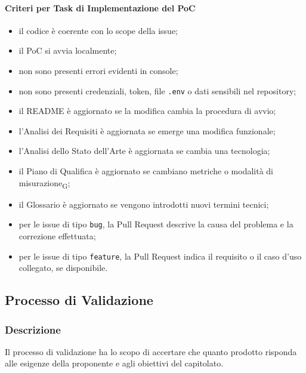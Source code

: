 \paragraph{Criteri per Task di Implementazione del PoC}

\begin{itemize}
    \item il codice è coerente con lo scope della issue;
    \item il PoC si avvia localmente;
    \item non sono presenti errori evidenti in console;
    \item non sono presenti credenziali, token, file \texttt{.env} o dati sensibili
    nel repository;
    \item il README è aggiornato se la modifica cambia la procedura di avvio;
    \item l'Analisi dei Requisiti è aggiornata se emerge una modifica funzionale;
    \item l'Analisi dello Stato dell'Arte è aggiornata se cambia una tecnologia;
    \item il Piano di Qualifica è aggiornato se cambiano metriche o modalità di
    misurazione\textsubscript{G};
    \item il Glossario è aggiornato se vengono introdotti nuovi termini tecnici;
    \item per le issue di tipo \texttt{bug}, la Pull Request descrive la causa del
    problema e la correzione effettuata;
    \item per le issue di tipo \texttt{feature}, la Pull Request indica il requisito
    o il caso d'uso collegato, se disponibile.
\end{itemize}


\subsection{Processo di Validazione}
\label{sec:validazione}

\subsubsection{Descrizione}

Il processo di validazione ha lo scopo di accertare che quanto prodotto risponda
alle esigenze della proponente e agli obiettivi del capitolato.

